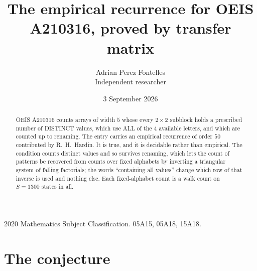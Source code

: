 \documentclass[11pt,a4paper]{article}
\title{The empirical recurrence for OEIS A210316, proved by transfer matrix}
\author{Adrian Perez Fontelles\\ \small Independent researcher}
\date{3 September 2026}
\theoremstyle{plain}
\theoremstyle{definition}
\begin{document}
\maketitle

\begin{abstract}
OEIS A210316 counts arrays of width $5$ whose every $2\times2$ subblock holds a
prescribed number of DISTINCT values, which use ALL of the $4$ available letters, and which
are counted up to renaming. The entry carries an empirical recurrence of order $50$
contributed by R.~H.~Hardin. It is true, and it is decidable rather than empirical. The
condition counts distinct values and so survives renaming, which lets the count of patterns be
recovered from counts over fixed alphabets by inverting a triangular system of falling
factorials; the words ``containing all values'' change which row of that inverse is used and
nothing else. Each fixed-alphabet count is a walk count on $S=1300$ states in all.
\end{abstract}

\noindent\small 2020 Mathematics Subject Classification. 05A15, 05A18, 15A18.\normalsize

\section{The conjecture}
\end{document}
